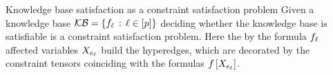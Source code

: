 \begin{example}{Knowledge base satisfaction as a constraint satisfaction problem}
    Given a knowledge base $\mathcal{KB}=\{f_{\ell}\,:\,\ell\in[p]\}$ deciding whether the knowledge base is satisfiable is a constraint satisfaction problem.
    Here the by the formula $f_{\ell}$ affected variables $X_{e_{\ell}}$ build the hyperedges, which are decorated by the constraint tensors coinciding with the formulas $f\left[X_{e_{\ell}}\right]$.
\end{example}